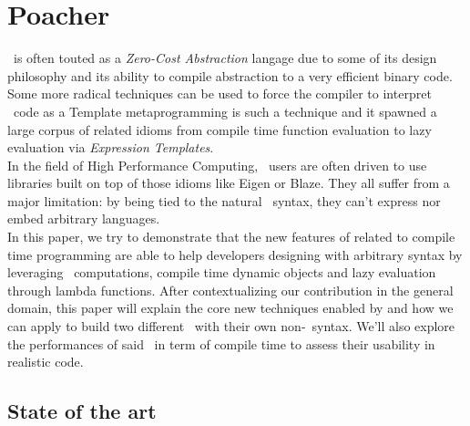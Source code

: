 \documentclass[../../main.tex]{subfiles}
\begin{document}

\chapter{Poacher}

\cpp~is often touted as a \textit{Zero-Cost Abstraction} langage due to some of
its design philosophy and its ability to compile abstraction to a very efficient
binary code. Some more radical techniques can be used to force the compiler to
interpret \cpp~code as a  Template metaprogramming is such a technique
and it spawned a large corpus of related idioms from compile time function
evaluation to lazy evaluation via \textit{Expression Templates}.\\

In the field of High Performance Computing, \cpp~users are often driven to use
libraries built on top of those idioms like Eigen\cite{eigen} or
Blaze\cite{blazelib,iglberger2012_2}. They all suffer from a major limitation:
by being tied to the natural \cpp~syntax, they can't express nor embed arbitrary
languages.\\

In this paper, we try to demonstrate that the new features of  related to
compile time programming are able to help developers designing \dsels{} with
arbitrary syntax by leveraging \constexpr~computations, compile time dynamic
objects and lazy evaluation through lambda functions. After contextualizing our
contribution in the general \dsels{} domain, this paper will explain the core
new techniques enabled by  and how we can apply to build two different
\dsels~with their own non-\cpp~syntax. We'll also explore the performances of
said \dsels~in term of compile time to assess their usability in realistic code.

\section{State of the art}
\end{document}
